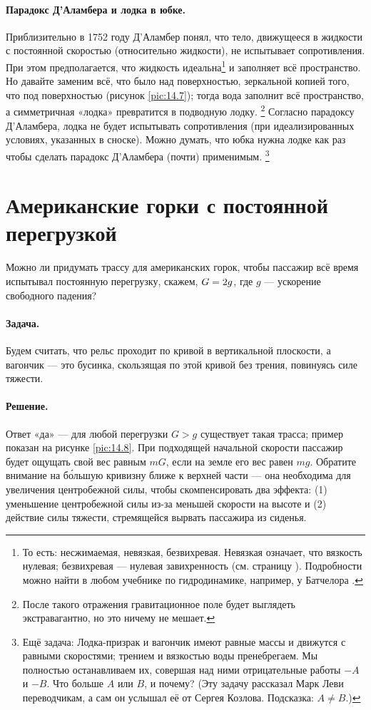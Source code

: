 \paragraph{Парадокс Д'Аламбера и лодка в юбке.}
Приблизительно в 1752 году Д'Аламбер понял,
что тело, движущееся в жидкости с постоянной скоростью (относительно жидкости),
не испытывает сопротивления.
При этом предполагается, что жидкость идеальна\footnote{То есть: несжимаемая, невязкая, безвихревая.
Невязкая означает, что вязкость нулевая;
безвихревая --- нулевая завихренность (см. страницу \pageref{def:завихренность}).
Подробности можно найти в любом учебнике по гидродинамике, например, у Батчелора \cite{batchelor1967}.} и заполняет всё пространство.
Но давайте заменим всё, что было над поверхностью, зеркальной копией того, что под поверхностью (рисунок \ref{pic:14.7});
тогда вода заполнит всё пространство, а симметричная «лодка» превратится в подводную лодку.%
\footnote{После такого отражения гравитационное поле будет выглядеть экстравагантно, но это ничему не мешает. \pr}
Согласно парадоксу Д'Аламбера, лодка не будет испытывать сопротивления (при идеализированных условиях, указанных в сноске).
Можно думать, что юбка нужна лодке как раз чтобы сделать парадокс Д'Аламбера (почти) применимым.%
\footnote{Ещё задача:
Лодка-призрак и вагончик имеют равные массы и движутся с равными скоростями; трением и вязкостью воды пренебрегаем.
Мы полностью останавливаем их, совершая над ними отрицательные работы $-A$ и $-B$.
Что больше $A$ или $B$, и почему? (Эту задачу рассказал Марк Леви переводчикам, а сам он услышал её от Сергея Козлова. Подсказка: $A\ne B$.) \pr}

\section{Американские горки с постоянной перегрузкой}\label{Американские горки с постоянной перегрузкой}

Можно ли придумать трассу для американских горок, чтобы пассажир всё время испытывал постоянную перегрузку, скажем, $G\z=2g$, где $g$ --- ускорение свободного падения?

\paragraph{Задача.}
Будем считать, что рельс проходит по кривой в вертикальной плоскости, а вагончик --- это бусинка, скользящая по этой кривой без трения, повинуясь силе тяжести.

\paragraph{Решение.}
Ответ «да» ---
для любой перегрузки $G>g$ существует такая трасса; пример показан на рисунке \ref{pic:14.8}.
При подходящей начальной скорости пассажир будет ощущать свой вес равным $mG$, если на земле его вес равен $mg$.
Обратите внимание на б\'{о}льшую кривизну ближе к верхней части --- она необходима для увеличения центробежной силы, чтобы скомпенсировать два эффекта: (1) уменьшение центробежной силы из-за меньшей скорости на высоте и (2) действие силы тяжести, стремящейся вырвать пассажира из сиденья.

